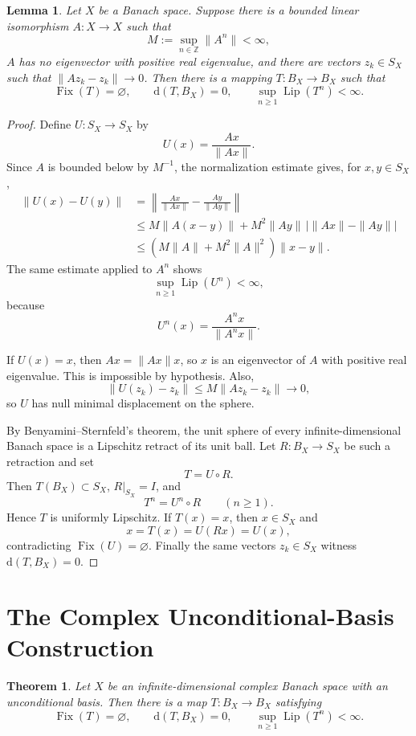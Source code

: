 \documentclass[11pt]{article}
\newtheorem{theorem}{Theorem}
\newtheorem{lemma}{Lemma}
\newcommand{\Fix}{\operatorname{Fix}}
\newcommand{\Lip}{\operatorname{Lip}}
\begin{document}
\begin{lemma}
Let \(X\) be a Banach space.  Suppose there is a bounded linear isomorphism
\(A:X\to X\) such that
\[
M:=\sup_{n\in\mathbb Z}\|A^n\|<\infty,
\]
\(A\) has no eigenvector with positive real eigenvalue, and there are
vectors \(z_k\in S_X\) such that \(\|Az_k-z_k\|\to0\).  Then there is a
mapping \(T:B_X\to B_X\) such that
\[
\Fix(T)=\varnothing,\qquad
\mathrm d(T,B_X)=0,\qquad
\sup_{n\ge1}\Lip(T^n)<\infty .
\]
\end{lemma}

\begin{proof}
Define \(U:S_X\to S_X\) by
\[
U(x)=\frac{Ax}{\|Ax\|}.
\]
Since \(A\) is bounded below by \(M^{-1}\), the normalization estimate gives,
for \(x,y\in S_X\),
\[
\begin{aligned}
\|U(x)-U(y)\|
&=\left\|\frac{Ax}{\|Ax\|}-\frac{Ay}{\|Ay\|}\right\|\\
&\le M\|A(x-y)\|+M^2\|Ay\|\,\bigl|\|Ax\|-\|Ay\|\bigr|\\
&\le (M\|A\|+M^2\|A\|^2)\|x-y\|.
\end{aligned}
\]
The same estimate applied to \(A^n\) shows
\[
\sup_{n\ge1}\Lip(U^n)<\infty,
\]
because
\[
U^n(x)=\frac{A^n x}{\|A^n x\|}.
\]

If \(U(x)=x\), then \(Ax=\|Ax\|x\), so \(x\) is an eigenvector of \(A\)
with positive real eigenvalue.  This is impossible by hypothesis.  Also,
\[
\|U(z_k)-z_k\|
\le M\|Az_k-z_k\|\to0,
\]
so \(U\) has null minimal displacement on the sphere.

By Benyamini--Sternfeld's theorem, the unit sphere of every
infinite-dimensional Banach space is a Lipschitz retract of its unit ball.
Let \(R:B_X\to S_X\) be such a retraction and set
\[
T=U\circ R.
\]
Then \(T(B_X)\subset S_X\), \(R|_{S_X}=I\), and
\[
T^n=U^n\circ R\qquad(n\ge1).
\]
Hence \(T\) is uniformly Lipschitz.  If \(T(x)=x\), then \(x\in S_X\) and
\[
x=T(x)=U(Rx)=U(x),
\]
contradicting \(\Fix(U)=\varnothing\).  Finally the same vectors \(z_k\in
S_X\) witness \(\mathrm d(T,B_X)=0\).
\end{proof}

\section*{The Complex Unconditional-Basis Construction}

\begin{theorem}
Let \(X\) be an infinite-dimensional complex Banach space with an
unconditional basis.  Then there is a map \(T:B_X\to B_X\) satisfying
\[
\Fix(T)=\varnothing,\qquad
\mathrm d(T,B_X)=0,\qquad
\sup_{n\ge1}\Lip(T^n)<\infty .
\]
\end{theorem}
\end{document}
